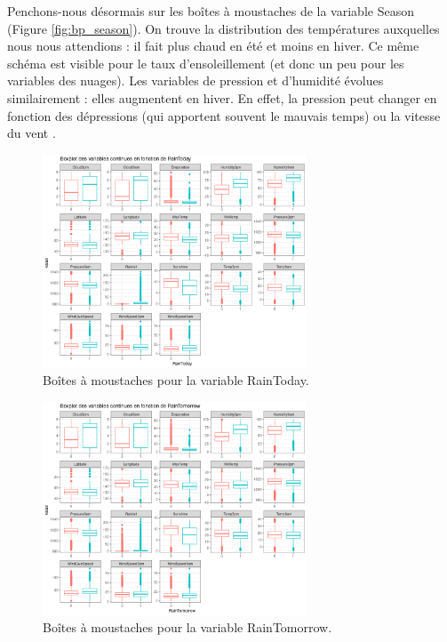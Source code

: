 \documentclass{article}
\begin{document}
Penchons-nous désormais sur les boîtes à moustaches de la variable Season (Figure \ref{fig:bp_season}). On trouve la distribution des températures auxquelles nous nous attendions : il fait plus chaud en été et moins en hiver. Ce même schéma est visible pour le taux d'ensoleillement (et donc un peu pour les variables des nuages). Les variables de pression et d'humidité évolues similairement : elles augmentent en hiver. En effet, la pression peut changer en fonction des dépressions (qui apportent souvent le mauvais temps) ou la vitesse du vent \cite{frwiki:190112465}.

\begin{figure}[htp]
    \centering
    \includegraphics[width=0.7\textwidth]{Images/boxplots/boxplot_RainToday.png}
    \caption{Boîtes à moustaches pour la variable RainToday.}
    \label{fig:bp_raintoday}
\end{figure}

\begin{figure}[htp]
    \centering
    \includegraphics[width=0.7\textwidth]{Images/boxplots/boxplot_RainTomorrow.png}
    \caption{Boîtes à moustaches pour la variable RainTomorrow.}
    \label{fig:bp_raintomorrow}
\end{figure}
\end{document}
